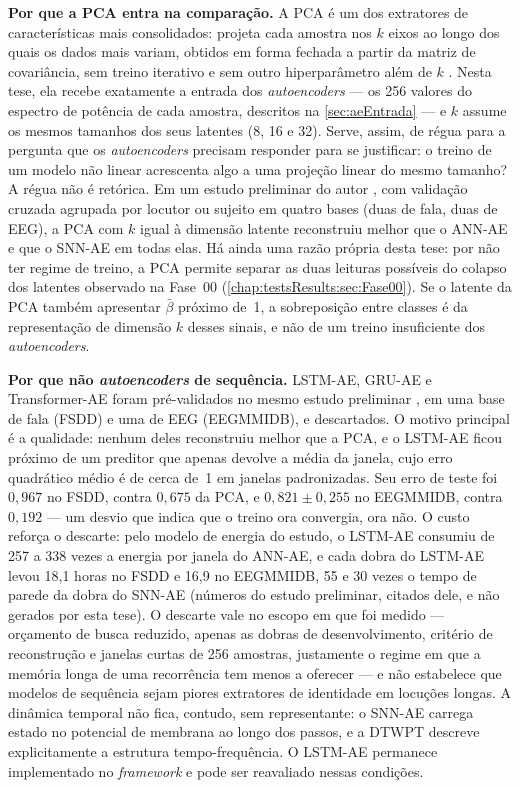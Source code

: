 		\par \textbf{Por que a \ac{PCA} entra na comparação.} A \ac{PCA} é um dos extratores de características mais consolidados: projeta cada amostra nos $k$ eixos ao longo dos quais os dados mais variam, obtidos em forma fechada a partir da matriz de covariância, sem treino iterativo e sem outro hiperparâmetro além de $k$ \cite{jolliffe2006principal}. Nesta tese, ela recebe exatamente a entrada dos \textit{autoencoders} --- os 256 valores do espectro de potência de cada amostra, descritos na \autoref{sec:aeEntrada} --- e $k$ assume os mesmos tamanhos dos seus latentes (8, 16 e 32). Serve, assim, de régua para a pergunta que os \textit{autoencoders} precisam responder para se justificar: o treino de um modelo não linear acrescenta algo a uma projeção linear do mesmo tamanho? A régua não é retórica. Em um estudo preliminar do autor \cite{furlan2026spiking}, com validação cruzada agrupada por locutor ou sujeito em quatro bases (duas de fala, duas de \ac{EEG}), a \ac{PCA} com $k$ igual à dimensão latente reconstruiu melhor que o \ac{ANN}-AE e que o \ac{SNN}-AE em todas elas. Há ainda uma razão própria desta tese: por não ter regime de treino, a \ac{PCA} permite separar as duas leituras possíveis do colapso dos latentes observado na Fase~00 (\autoref{chap:testsResults:sec:Fase00}). Se o latente da \ac{PCA} também apresentar $\bar\beta$ próximo de~1, a sobreposição entre classes é da representação de dimensão $k$ desses sinais, e não de um treino insuficiente dos \textit{autoencoders}.

		\par \textbf{Por que não \textit{autoencoders} de sequência.} \ac{LSTM}-AE, \ac{GRU}-AE e Transformer-AE foram pré-validados no mesmo estudo preliminar \cite{furlan2026spiking}, em uma base de fala (FSDD) e uma de \ac{EEG} (EEGMMIDB), e descartados. O motivo principal é a qualidade: nenhum deles reconstruiu melhor que a \ac{PCA}, e o \ac{LSTM}-AE ficou próximo de um preditor que apenas devolve a média da janela, cujo erro quadrático médio é de cerca de~1 em janelas padronizadas. Seu erro de teste foi $0{,}967$ no FSDD, contra $0{,}675$ da \ac{PCA}, e $0{,}821 \pm 0{,}255$ no EEGMMIDB, contra $0{,}192$ --- um desvio que indica que o treino ora convergia, ora não. O custo reforça o descarte: pelo modelo de energia do estudo, o \ac{LSTM}-AE consumiu de 257 a 338 vezes a energia por janela do \ac{ANN}-AE, e cada dobra do \ac{LSTM}-AE levou 18,1 horas no FSDD e 16,9 no EEGMMIDB, 55 e 30 vezes o tempo de parede da dobra do \ac{SNN}-AE (números do estudo preliminar, citados dele, e não gerados por esta tese). O descarte vale no escopo em que foi medido --- orçamento de busca reduzido, apenas as dobras de desenvolvimento, critério de reconstrução e janelas curtas de 256 amostras, justamente o regime em que a memória longa de uma recorrência tem menos a oferecer --- e não estabelece que modelos de sequência sejam piores extratores de identidade em locuções longas. A dinâmica temporal não fica, contudo, sem representante: o \ac{SNN}-AE carrega estado no potencial de membrana ao longo dos passos, e a \ac{DTWPT} descreve explicitamente a estrutura tempo-frequência. O \ac{LSTM}-AE permanece implementado no \textit{framework} e pode ser reavaliado nessas condições.

